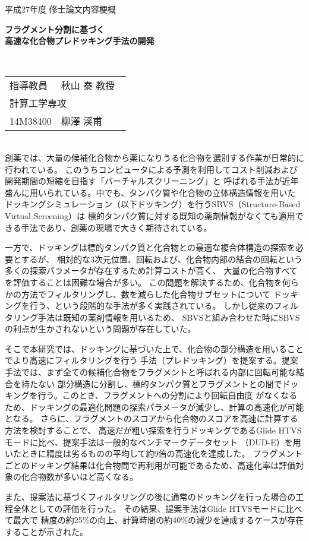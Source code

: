 {
 \thispagestyle{empty}
 \large
 \noindent
 平成27年度 修士論文内容梗概
　\\
 \begin{center}
  \textbf{\LARGE フラグメント分割に基づく\\高速な化合物プレドッキング手法の開発}
 \end{center}
　\\
 \hfill 
 \begin{tabular}{llll}
 指導教員& \multicolumn{3}{l}{秋山 泰 教授} \\
  \multicolumn{4}{l}{計算工学専攻} \\
 14M38400\hspace{.5cm} & {柳澤 渓甫}
 \end{tabular}

\mbox{}\\

創薬では、大量の候補化合物から薬になりうる化合物を選別する作業が日常的に行われている。
このうちコンピュータによる予測を利用してコスト削減および開発期間の短縮を目指す「バーチャルスクリーニング」と
呼ばれる手法が近年盛んに用いられている。中でも、タンパク質や化合物の立体構造情報を用いた
ドッキングシミュレーション（以下ドッキング）を行うSBVS（Structure-Based Virtual Screening）は
標的タンパク質に対する既知の薬剤情報がなくても適用できる手法であり、創薬の現場で大きく期待されている。

一方で、ドッキングは標的タンパク質と化合物との最適な複合体構造の探索を必要とするが、
相対的な3次元位置、回転および、化合物内部の結合の回転という多くの探索パラメータが存在するため計算コストが高く、
大量の化合物すべてを評価することは困難な場合が多い。
この問題を解決するため、化合物を何らかの方法でフィルタリングし、数を減らした化合物サブセットについて
ドッキングを行う、という段階的な手法が多く実践されている。
しかし従来のフィルタリング手法は既知の薬剤情報を用いるため、
SBVSと組み合わせた時にSBVSの利点が生かされないという問題が存在していた。

そこで本研究では、ドッキングに基づいた上で、化合物の部分構造を用いることでより高速にフィルタリングを行う
手法（プレドッキング）を提案する。提案手法では、まず全ての候補化合物をフラグメントと呼ばれる内部に回転可能な結合を持たない
部分構造に分割し、標的タンパク質とフラグメントとの間でドッキングを行う。このとき、フラグメントへの分割により回転自由度
がなくなるため、ドッキングの最適化問題の探索パラメータが減少し、計算の高速化が可能となる。
さらに、フラグメントのスコアから化合物のスコアを高速に計算する方法を検討することで、
高速だが粗い探索を行うドッキングであるGlide HTVSモードに比べ、提案手法は一般的なベンチマークデータセット
（DUD-E）を用いたときに精度は劣るものの平均して約9倍の高速化を達成した。
フラグメントごとのドッキング結果は化合物間で再利用が可能であるため、高速化率は評価対象の化合物数が多いほど高くなる。

また、提案法に基づくフィルタリングの後に通常のドッキングを行った場合の工程全体としての評価を行った。
その結果、提案手法はGlide HTVSモードに比べて最大で
精度の約25\%の向上、計算時間の約40\%の減少を達成するケースが存在することが示された。

\thispagestyle{empty}
\addtocounter{page}{-1}
}
